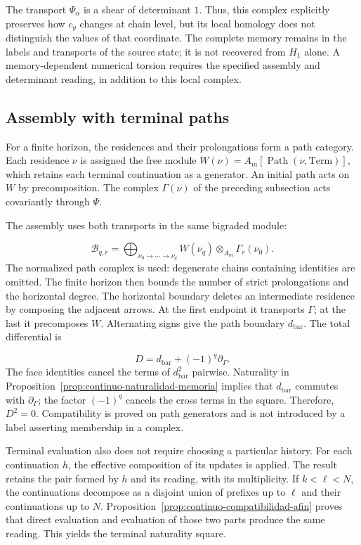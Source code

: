 The transport \(\Psi_\alpha\) is a shear of determinant \(1\). Thus, this complex explicitly preserves how \(c_y\) changes at chain level, but its local homology does not distinguish the values of that coordinate. The complete memory remains in the labels and transports of the source state; it is not recovered from \(H_1\) alone. A memory-dependent numerical torsion requires the specified assembly and determinant reading, in addition to this local complex.

\subsection{Assembly with terminal paths}
For a finite horizon, the residences and their prolongations form a path category. Each residence \(\nu\) is assigned the free module \(W(\nu)=A_m[\operatorname{Path}(\nu,\mathrm{Term})]\), which retains each terminal continuation as a generator. An initial path acts on \(W\) by precomposition. The complex \(\Gamma(\nu)\) of the preceding subsection acts covariantly through \(\Psi\).

The assembly uses both transports in the same bigraded module:

\[
\mathcal B_{q,r}=
\bigoplus_{\nu_0\to\cdots\to\nu_q}
W(\nu_q)\otimes_{A_m}\Gamma_r(\nu_0).
\]
The normalized path complex is used: degenerate chains containing identities are omitted. The finite horizon then bounds the number of strict prolongations and the horizontal degree. The horizontal boundary deletes an intermediate residence by composing the adjacent arrows. At the first endpoint it transports \(\Gamma\); at the last it precomposes \(W\). Alternating signs give the path boundary \(d_{\mathrm{bar}}\). The total differential is

\[
D=d_{\mathrm{bar}}+(-1)^q\partial_\Gamma.
\]
The face identities cancel the terms of \(d_{\mathrm{bar}}^2\) pairwise. Naturality in Proposition~\ref{prop:continuo-naturalidad-memoria} implies that \(d_{\mathrm{bar}}\) commutes with \(\partial_\Gamma\); the factor \((-1)^q\) cancels the cross terms in the square. Therefore, \(D^2=0\). Compatibility is proved on path generators and is not introduced by a label asserting membership in a complex.

Terminal evaluation also does not require choosing a particular history. For each continuation \(h\), the effective composition of its updates is applied. The result retains the pair formed by \(h\) and its reading, with its multiplicity. If \(k<\ell<N\), the continuations decompose as a disjoint union of prefixes up to \(\ell\) and their continuations up to \(N\). Proposition~\ref{prop:continuo-compatibilidad-afin} proves that direct evaluation and evaluation of those two parts produce the same reading. This yields the terminal naturality square.

